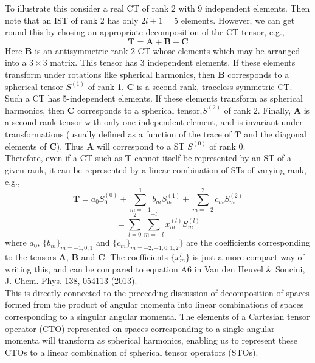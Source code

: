 \documentclass[12pt]{article}
\begin{document}
\noindent To illustrate this consider a real CT of rank 2 with $9$ independent
elements. Then note that an IST of rank 2 has only $2l+1=5$ elements. However,
we can get round this by chosing an appropriate decomposition of the CT tensor,
e.g., \begin{equation} \mathbf{T} = \mathbf{A}+\mathbf{B}+\mathbf{C}
\end{equation} \noindent Here $\mathbf{B}$ is an antisymmetric rank 2 CT whose
elements which may be arranged into a $3\times3$ matrix. This tensor has 3
independent elements. If these elements transform under rotations like
spherical harmonics, then $\mathbf{B}$ corresponds to a spherical tensor
$S^{(1)}$ of rank 1.  $\mathbf{C}$ is a second-rank, traceless symmetric CT.
Such a CT has 5-independent elements.  If these elements transform as spherical
harmonics, then $\mathbf{C}$ corresponds to a spherical tensor,$S^{(2)}$ of
rank 2.  Finally, $\mathbf{A}$ is a second rank tensor with only one
independent element, and is invariant under transformations (usually defined as
a function of the trace of $\mathbf{T}$ and the diagonal elements of
$\mathbf{C}$). Thus $\mathbf{A}$ will correspond to a ST $S^{(0)}$ of rank 0.\\

\noindent Therefore, even if a CT such as  $\mathbf{T}$ cannot itself be
represented by an ST of a given rank, it can be represented by a linear
combination of STs of varying rank, e.g.,
\begin{equation*}
\mathbf{T} =
  a_{0}S^{(0)}_{0}
 +\sum_{m=-1}^{1}b_{m}S_{m}^{(1)}
 +\sum_{m=-2}^{2}c_{m}S_{m}^{(2)}
\end{equation*}
\begin{equation}
 =\sum_{l=0}^{2}\sum_{m=-l}^{+l}x^{(l)}_{m}S_{m}^{(l)}
\end{equation}
where $a_{0}$, $\{b_{m}\}_{m=-1,0,1}$  and $\{c_{m}\}_{m=-2,-1,0,1,2}\}$ are
the coefficients corresponding to the tensors $\mathbf{A}$, $\mathbf{B}$ and
$\mathbf{C}$.  The coefficients $\{x_{m}^{l}\}$ is just a more compact way of
writing this, and can be compared to equation A6 in Van den Heuvel \& Soncini,
J. Chem. Phys. 138, 054113 (2013).\\

\noindent This is directly connected to the preceeding discussion of
decomposition of spaces formed from the product of angular momenta into linear
combinations of spaces corresponding to a singular angular momenta. The
elements of a Cartesian tensor operator (CTO) represented on spaces
corresponding to a single angular momenta will transform as spherical
harmonics, enabling us to represent these CTOs to a linear combination of
spherical tensor operators (STOs).\\
\end{document}

